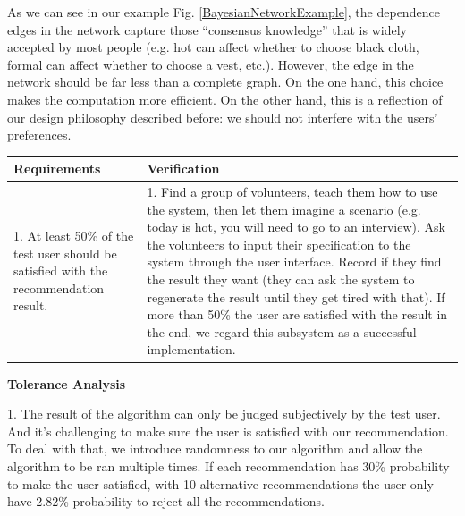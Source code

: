 As we can see in our example Fig. \ref{BayesianNetworkExample}, the dependence edges in the network capture those “consensus knowledge” that is widely accepted by most people (e.g. hot can affect whether to choose black cloth, formal can affect whether to choose a vest, etc.). However, the edge in the network should be far less than a complete graph. On the one hand, this choice makes the computation more efficient. On the other hand, this is a reflection of our design philosophy described before: we should not interfere with the users' preferences.
\begin{table}[h]
    \centering
    \begin{tabularx}{\textwidth}{|X|X|}
    \hline
    Requirements & Verification \\
    \hline
    1. At least 50\% of the test user should be satisfied with the recommendation result. 
    
    & 
    1. Find a group of volunteers, teach them how to use the system, then let them imagine a scenario (e.g. today is hot, you will need to go to an interview). Ask the volunteers to input their specification to the system through the user interface. Record if they find the result they want (they can ask the system to regenerate the result until they get tired with that). If more than 50\% the user are satisfied with the result in the end, we regard this subsystem as a successful implementation.

    \\
    \hline
    \end{tabularx}
\end{table}

\noindent\textbf{Tolerance Analysis} 


 1. The result of the algorithm can only be judged subjectively by the test user. And it's challenging to make sure the user is satisfied with our recommendation. To deal with that, we introduce randomness to our algorithm and allow the algorithm to be ran multiple times. If each recommendation has 30\% probability to make the user satisfied, with 10 alternative recommendations the user only have 2.82\% probability to reject all the recommendations. 

